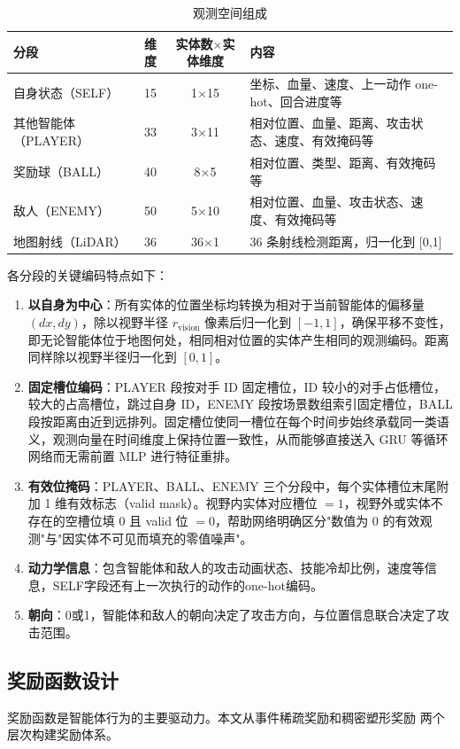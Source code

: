 \documentclass[12pt, a4paper, UTF8]{ctexart}
\numberwithin{equation}{section}
\begin{document}
\begin{table}[htbp!]
  \centering
  \caption{ 观测空间组成}
  \label{tab:observation}
  \begin{tabularx}{\textwidth}{lccX}
    \toprule
    分段 & 维度 & 实体数$\times$实体维度 & 内容 \\
    \midrule
    自身状态（SELF） & 15 & 1$\times$15 & 坐标、血量、速度、上一动作 one-hot、回合进度等 \\
    其他智能体（PLAYER） & 33 & 3$\times$11 & 相对位置、血量、距离、攻击状态、速度、有效掩码等 \\
    奖励球（BALL） & 40 & 8$\times$5 & 相对位置、类型、距离、有效掩码等 \\
    敌人（ENEMY） & 50 & 5$\times$10 & 相对位置、血量、攻击状态、速度、有效掩码等 \\
    地图射线（LiDAR） & 36 & 36$\times$1 & 36 条射线检测距离，归一化到 [0,1] \\
    \bottomrule
  \end{tabularx}
\end{table}

各分段的关键编码特点如下：
\begin{enumerate}[label=(\arabic*)]
  \item \textbf{以自身为中心}：所有实体的位置坐标均转换为相对于当前智能体的偏移量 $(dx, dy)$，除以视野半径 $r_{\text{vision}}$ 像素后归一化到 $[-1,1]$，确保平移不变性，即无论智能体位于地图何处，相同相对位置的实体产生相同的观测编码。距离同样除以视野半径归一化到 $[0,1]$。
  \item \textbf{固定槽位编码}：PLAYER 段按对手 ID 固定槽位，ID 较小的对手占低槽位，较大的占高槽位，跳过自身 ID，ENEMY 段按场景数组索引固定槽位，BALL 段按距离由近到远排列。固定槽位使同一槽位在每个时间步始终承载同一类语义，观测向量在时间维度上保持位置一致性，从而能够直接送入 GRU 等循环网络而无需前置 MLP 进行特征重排。
  \item \textbf{有效位掩码}：PLAYER、BALL、ENEMY 三个分段中，每个实体槽位末尾附加 1 维有效标志（valid mask）。视野内实体对应槽位 $=1$，视野外或实体不存在的空槽位填 0 且 valid 位 $=0$，帮助网络明确区分"数值为 0 的有效观测"与"因实体不可见而填充的零值噪声"。
  \item \textbf{动力学信息}：包含智能体和敌人的攻击动画状态、技能冷却比例，速度等信息，SELF字段还有上一次执行的动作的one-hot编码。
  \item \textbf{朝向}：0或1，智能体和敌人的朝向决定了攻击方向，与位置信息联合决定了攻击范围。
\end{enumerate}

\subsection{奖励函数设计}
奖励函数是智能体行为的主要驱动力。本文从事件稀疏奖励和稠密塑形奖励
两个层次构建奖励体系。
\end{document}
